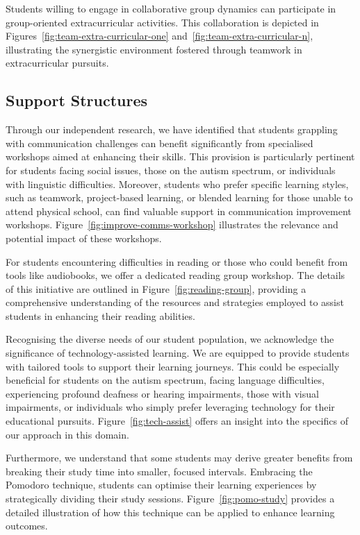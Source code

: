 Students willing to engage in collaborative group dynamics can participate in group-oriented extracurricular activities. This collaboration is depicted in Figures~\ref{fig:team-extra-curricular-one} and~\ref{fig:team-extra-curricular-n}, illustrating the synergistic environment fostered through teamwork in extracurricular pursuits.




\subsection{Support Structures}
Through our independent research, we have identified that students grappling with communication challenges can benefit significantly from specialised workshops aimed at enhancing their skills. This provision is particularly pertinent for students facing social issues, those on the autism spectrum, or individuals with linguistic difficulties. Moreover, students who prefer specific learning styles, such as teamwork, project-based learning, or blended learning for those unable to attend physical school, can find valuable support in communication improvement workshops. Figure~\ref{fig:improve-comms-workshop} illustrates the relevance and potential impact of these workshops.



For students encountering difficulties in reading or those who could benefit from tools like audiobooks, we offer a dedicated reading group workshop. The details of this initiative are outlined in Figure~\ref{fig:reading-group}, providing a comprehensive understanding of the resources and strategies employed to assist students in enhancing their reading abilities.



Recognising the diverse needs of our student population, we acknowledge the significance of technology-assisted learning. We are equipped to provide students with tailored tools to support their learning journeys. This could be especially beneficial for students on the autism spectrum, facing language difficulties, experiencing profound deafness or hearing impairments, those with visual impairments, or individuals who simply prefer leveraging technology for their educational pursuits. Figure~\ref{fig:tech-assist} offers an insight into the specifics of our approach in this domain.



Furthermore, we understand that some students may derive greater benefits from breaking their study time into smaller, focused intervals. Embracing the Pomodoro technique, students can optimise their learning experiences by strategically dividing their study sessions. Figure~\ref{fig:pomo-study} provides a detailed illustration of how this technique can be applied to enhance learning outcomes.

